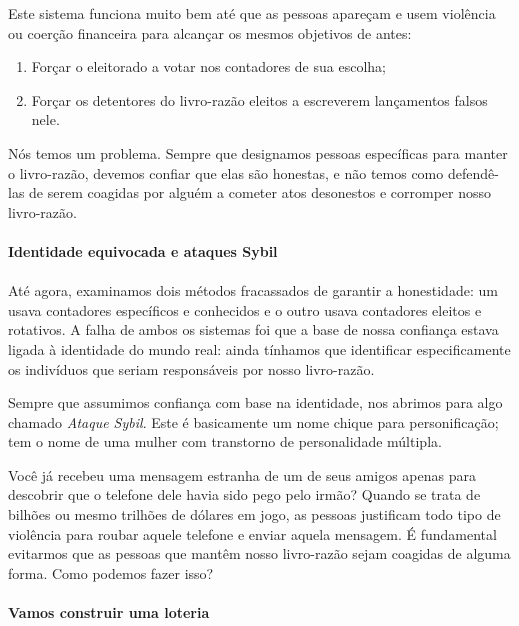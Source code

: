 Este sistema funciona muito bem até que as pessoas apareçam e usem violência ou coerção financeira para alcançar os mesmos objetivos de antes:

\begin{samepage}
\begin{enumerate}
\item Forçar o eleitorado a votar nos contadores de sua escolha;
\item Forçar os detentores do livro-razão eleitos a escreverem lançamentos falsos nele.
\end{enumerate}
\end{samepage}

Nós temos um problema. Sempre que designamos pessoas específicas para manter o livro-razão, devemos confiar que elas são honestas, e não temos como defendê-las de serem coagidas por alguém a cometer atos desonestos e corromper nosso livro-razão.

\paragraph{Identidade equivocada e ataques Sybil}
\paragraph{}
Até agora, examinamos dois métodos fracassados de garantir a honestidade: um usava contadores específicos e conhecidos e o outro usava contadores eleitos e rotativos. A falha de ambos os sistemas foi que a base de nossa confiança estava ligada à identidade do mundo real: ainda tínhamos que identificar especificamente os indivíduos que seriam responsáveis por nosso livro-razão.

Sempre que assumimos confiança com base na identidade, nos abrimos para algo chamado \textit{Ataque Sybil}. Este é basicamente um nome chique para personificação; tem o nome de uma mulher com transtorno de personalidade múltipla.

Você já recebeu uma mensagem estranha de um de seus amigos apenas para descobrir que o telefone dele havia sido pego pelo irmão? Quando se trata de bilhões ou mesmo trilhões de dólares em jogo, as pessoas justificam todo tipo de violência para roubar aquele telefone e enviar aquela mensagem. É fundamental evitarmos que as pessoas que mantêm nosso livro-razão sejam coagidas de alguma forma. Como podemos fazer isso?

\paragraph{Vamos construir uma loteria}
